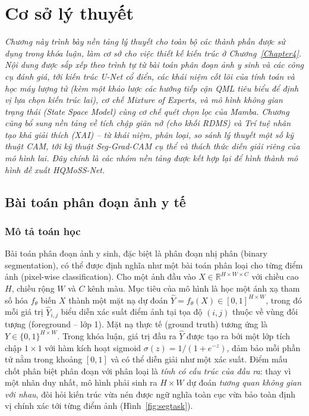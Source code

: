 \chapter{Cơ sở lý thuyết}
\label{Chapter3}

\textit{Chương này trình bày nền tảng lý thuyết cho toàn bộ các thành phần được sử dụng trong khóa luận, làm cơ sở cho việc thiết kế kiến trúc ở Chương~\ref{Chapter4}. Nội dung được sắp xếp theo trình tự từ bài toán phân đoạn ảnh y sinh và các công cụ đánh giá, tới kiến trúc U-Net cổ điển, các khái niệm cốt lõi của tính toán và học máy lượng tử (kèm một khảo lược các hướng tiếp cận QML tiêu biểu để định vị lựa chọn kiến trúc lai), cơ chế Mixture of Experts, và mô hình không gian trạng thái (State Space Model) cùng cơ chế quét chọn lọc của Mamba. Chương cũng bổ sung nền tảng về tích chập giãn nở (cho khối RDMS) và Trí tuệ nhân tạo khả giải thích (XAI) -- từ khái niệm, phân loại, so sánh lý thuyết một số kỹ thuật CAM, tới kỹ thuật Seg-Grad-CAM cụ thể và thách thức diễn giải riêng của mô hình lai. Đây chính là các nhóm nền tảng được kết hợp lại để hình thành mô hình đề xuất HQMoSS-Net.}

\section{Bài toán phân đoạn ảnh y tế}
\subsection{Mô tả toán học}
Bài toán phân đoạn ảnh y sinh, đặc biệt là phân đoạn nhị phân (binary segmentation), có thể được định nghĩa như một bài toán phân loại cho từng điểm ảnh (pixel-wise classification). Cho một ảnh đầu vào $X \in \mathbb{R}^{H \times W \times C}$ với chiều cao $H$, chiều rộng $W$ và $C$ kênh màu. Mục tiêu của mô hình là học một ánh xạ tham số hóa $f_\theta$ biến $X$ thành một mặt nạ dự đoán $\hat{Y} = f_\theta(X) \in [0, 1]^{H \times W}$, trong đó mỗi giá trị $\hat{Y}_{i,j}$ biểu diễn xác suất điểm ảnh tại tọa độ $(i,j)$ thuộc về vùng đối tượng (foreground -- lớp 1). Mặt nạ thực tế (ground truth) tương ứng là $Y \in \{0, 1\}^{H \times W}$. Trong khóa luận, giá trị đầu ra $\hat{Y}$ được tạo ra bởi một lớp tích chập $1 \times 1$ với hàm kích hoạt sigmoid $\sigma(z)=1/(1+e^{-z})$, đảm bảo mỗi phần tử nằm trong khoảng $[0,1]$ và có thể diễn giải như một xác suất. Điểm mấu chốt phân biệt phân đoạn với phân loại là \emph{tính có cấu trúc của đầu ra}: thay vì một nhãn duy nhất, mô hình phải sinh ra $H\times W$ dự đoán \emph{tương quan không gian với nhau}, đòi hỏi kiến trúc vừa nén được ngữ nghĩa toàn cục vừa bảo toàn định vị chính xác tới từng điểm ảnh (Hình~\ref{fig:segtask}).

